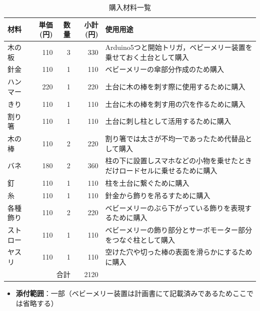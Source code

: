 \documentclass[a4paper,12pt]{ltjsarticle}
\begin{document}
\begin{itemize}
      \begin{table}[htbp]
        \centering
        \caption{購入材料一覧}
        \label{tab:materials}
        \begin{tabularx}{\textwidth}{l r r r X}
          \hline
          材料 & 単価(円) & 数量 & 小計(円) & 使用用途 \\
          \hline
          木の板   & 110 & 3 & 330 & Arduino5つと開始トリガ，ベビーメリー装置を乗せておく土台として購入 \\
          針金     & 110 & 1 & 110 & ベビーメリーの傘部分作成のため購入 \\
          ハンマー & 220 & 1 & 220 & 土台に木の棒を刺す際に使用するために購入 \\
          きり     & 110 & 1 & 110 & 土台に木の棒を刺す用の穴を作るために購入 \\
          割り箸   & 110 & 1 & 110 & 土台に刺し柱として活用するために購入 \\
          木の棒   & 110 & 2 & 220 & 割り箸では太さが不均一であったため代替品として購入 \\
          バネ     & 180 & 2 & 360 & 柱の下に設置しスマホなどの小物を乗せたときだけロードセルに乗せるために購入 \\
          釘       & 110 & 1 & 110 & 柱を土台に繋ぐために購入 \\
          糸       & 110 & 1 & 110 & 針金から飾りを吊るすために購入 \\
          各種飾り & 110 & 2 & 220 & ベビーメリーのぶら下がっている飾りを表現するために購入 \\
          ストロー & 110 & 1 & 110 & ベビーメリーの飾り部分とサーボモーター部分をつなぐ柱として購入 \\
          ヤスリ   & 110 & 1 & 110 & 空けた穴や切った棒の表面を滑らかにするために購入 \\
          \hline
          \multicolumn{3}{r}{合計} & 2120 & \\
          \hline
        \end{tabularx}
      \end{table}
\end{itemize}

\clearpage
\begin{itemize}
  \item \textbf{添付範囲}：一部（ベビーメリー装置は計画書にて記載済みであるためここでは省略する）
\end{itemize}
\end{document}
